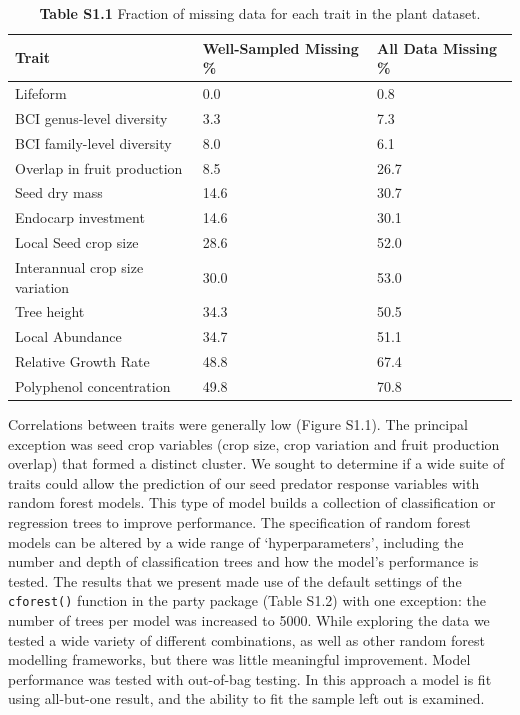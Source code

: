 \documentclass[11pt]{article}
\begin{document}
\begin{table}[]
\caption{\textbf{Table S1.1} Fraction of missing data for each trait in the plant dataset. }
\small
\begin{tabular}{@{}lll@{}}
\toprule
Trait                           & Well-Sampled Missing \% & All Data Missing \% \\ \midrule
Lifeform                        & 0.0                     & 0.8                 \\
BCI genus-level diversity       & 3.3                     & 7.3                 \\
BCI family-level diversity      & 8.0                     & 6.1                 \\
Overlap in fruit production     & 8.5                     & 26.7                \\
Seed dry mass                   & 14.6                    & 30.7                \\
Endocarp investment             & 14.6                    & 30.1                \\
Local Seed crop size            & 28.6                    & 52.0                \\
Interannual crop size variation & 30.0                    & 53.0                \\
Tree height                     & 34.3                    & 50.5                \\
Local Abundance                 & 34.7                    & 51.1                \\
Relative Growth Rate            & 48.8                    & 67.4                \\
Polyphenol concentration        & 49.8                    & 70.8                \\ \bottomrule
\end{tabular}
\end{table}

Correlations between traits were generally low (Figure S1.1). The principal exception was seed crop variables (crop size, crop variation and fruit production overlap) that formed a distinct cluster. 
We sought to determine if a wide suite of traits could allow the prediction of our seed predator response variables with random forest models. This type of model builds a collection of classification or regression trees to improve performance. The specification of random forest models can be altered by a wide range of ‘hyperparameters’, including the number and depth of classification trees and how the model’s performance is tested. The results that we present made use of the default settings of the \texttt{cforest()} function in the party package (Table S1.2) with one exception: the number of trees per model was increased to 5000. While exploring the data we tested a wide variety of different combinations, as well as other random forest modelling frameworks, but there was little meaningful improvement. Model performance was tested with out-of-bag testing. In this approach a model is fit using all-but-one result, and the ability to fit the sample left out is examined.
\end{document}
